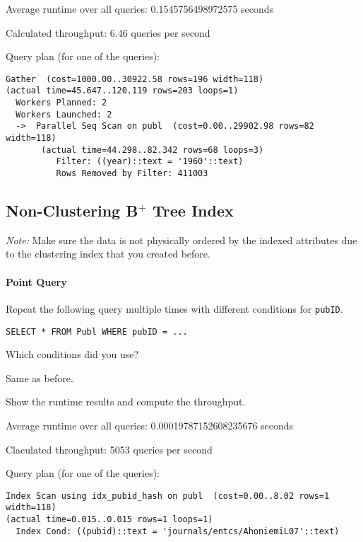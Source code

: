 \documentclass[11pt]{scrartcl}
\begin{document}
Average runtime over all queries: 0.1545756498972575 seconds

Calculated throughput: 6.46 queries per second

Query plan (for one of the queries):

{\small
\parskip0pt\begin{verbatim}
Gather  (cost=1000.00..30922.58 rows=196 width=118) 
(actual time=45.647..120.119 rows=203 loops=1)
  Workers Planned: 2
  Workers Launched: 2
  ->  Parallel Seq Scan on publ  (cost=0.00..29902.98 rows=82 width=118) 
       (actual time=44.298..82.342 rows=68 loops=3)
          Filter: ((year)::text = '1960'::text)
          Rows Removed by Filter: 411003
\end{verbatim}}

\subsection*{Non-Clustering B$^+$ Tree Index}

\emph{Note:} Make sure the data is not physically ordered by the indexed attributes due to the clustering index that you created before.

\paragraph{Point Query}

Repeat the following query multiple times with different conditions for \texttt{pubID}.

\begin{lstlisting}[style=dbtsql]
SELECT * FROM Publ WHERE pubID = ...
\end{lstlisting}

Which conditions did you use?

Same as before.

Show the runtime results and compute the throughput.

Average runtime over all queries: 0.00019787152608235676 seconds

Claculated throughput: 5053 queries per second

Query plan (for one of the queries):

{\small
\parskip0pt\begin{verbatim}
Index Scan using idx_pubid_hash on publ  (cost=0.00..8.02 rows=1 width=118) 
(actual time=0.015..0.015 rows=1 loops=1)
  Index Cond: ((pubid)::text = 'journals/entcs/AhoniemiL07'::text)
\end{verbatim}}
\end{document}
